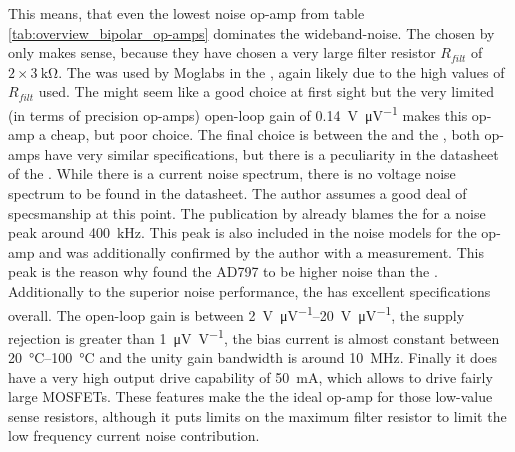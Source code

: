 This means, that even the lowest noise op-amp from table \ref{tab:overview_bipolar_op-amps} dominates the wideband-noise. The  chosen by \cite{laser_driver_digital} only makes sense, because they have chosen a very large filter resistor $R_{filt}$ of $2 \times \qty{3}{\kilo\ohm}$. The  was used by Moglabs in the , again likely due to the high values of $R_{filt}$ used. The  might seem like a good choice at first sight but the very limited (in terms of precision op-amps) open-loop gain of \qty{0.14}{\V \per \uV} makes this op-amp a cheap, but poor choice. The final choice is between the  and the , both op-amps have very similar specifications, but there is a peculiarity in the datasheet of the  \cite{datasheet_LT1028}. While there is a current noise spectrum, there is no voltage noise spectrum to be found in the datasheet. The author assumes a good deal of specsmanship at this point. The publication by \citeauthor{libbrecht_hall} already blames the  for a noise peak around \qty{400}{\kHz}. This peak is also included in the noise models for the op-amp and was additionally confirmed by the author with a measurement. This peak is the reason why \citeauthor{laser_driver_mosfet_noise} found the AD797 to be higher noise than the . Additionally to the superior noise performance, the  has excellent specifications overall. The open-loop gain is between \qtyrange[range-units = single]{2}{20}{\V \per \uV}, the supply rejection is greater than \qty{1}{\uV \per \V}, the bias current is almost constant between \qtyrange[range-units = single]{20}{100}{\celsius} and the unity gain bandwidth is around \qty{10}{\MHz}. Finally it does have a very high output drive capability of \qty{50}{\mA}, which allows to drive fairly large MOSFETs. These features make the  the ideal op-amp for those low-value sense resistors, although it puts limits on the maximum filter resistor to limit the low frequency current noise contribution.


